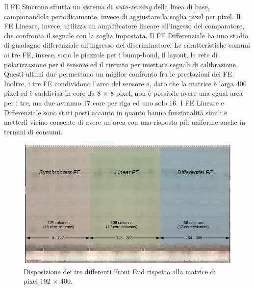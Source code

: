 Il FE Sincrono sfrutta un sistema di \textit{auto-zeroing} della linea di base, campionandola periodicamente, invece di aggiustare la soglia pixel per pixel. 
Il FE Lineare, invece, utilizza un amplificatore lineare all'ingesso del comparatore, che confronta il segnale con la soglia impostata. 
Il FE Differenziale ha uno stadio di guadagno differenziale all'ingresso del discriminatore. %
Le caratteristiche comuni ai tre FE, invece, sono le piazzole per i bump-bond, il layout, la rete di polarizzazione per il sensore ed il circuito per iniettare segnali di calibrazione.
Questi ultimi due permettono un miglior confronto fra le prestazioni dei FE.
Inoltre, i tre FE condividono l'area del sensore e, dato che la matrice è larga 400 pixel ed è suddivisa in core da 8 $\times$ 8 pixel, non è possibile avere una egual area per i tre, ma due avranno 17 core per riga ed uno solo 16.
I FE Lineare e Differenziale sono stati posti accanto in quanto hanno funzionalità simili e metterli vicino consente di avere un'area con una risposta più uniforme anche in termini di consumi. 
\begin{figure}
\centering
\includegraphics[scale=.3]{Immagini/FrontEnd}
\caption{Disposizione dei tre differenti Front End rispetto alla matrice di pixel 192 $\times$ 400.}
\label{FrontEnd}
\end{figure}


